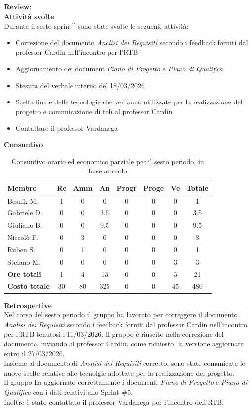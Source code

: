 \documentclass[a4paper,10pt]{article}
\begin{document}
\textbf{Review}: \\
\textbf{Attività svolte}\\
Durante il sesto sprint$^G$ sono state svolte le seguenti attività:
\begin{itemize}
  \item Correzione del documento \textit{Analisi dei Requisiti} secondo i feedback forniti dal professor Cardin nell'incontro per l'RTB
  \item Aggiornamento dei document \textit{Piano di Progetto} e \textit{Piano di Qualifica}
  \item Stesura del verbale interno del 18/03/2026
  \item Scelta finale delle tecnologie che verranno utilizzate per la realizzazione del progetto e comunicazione di tali al professor Cardin
  \item Contattare il professor Vardanega
\end{itemize}
\textbf{Consuntivo}
\begin{table}[H]
\centering
\begin{tabular}{|l|c|c|c|c|c|c|c|}
\hline
\textbf{Membro} & \textbf{Re} & \textbf{Amm} & \textbf{An} & \textbf{Progr} & \textbf{Proge} & \textbf{Ve} & \textbf{Totale} \\
\hline
Besnik M.   & 1   & 0   & 0   & 0   & 0   & 0   & 1   \\
Gabriele D. & 0   & 0   & 3.5 & 0   & 0   & 0   & 3.5 \\
Giuliano B. & 0   & 0   & 9.5 & 0   & 0   & 0   & 9.5 \\
Niccolò F.  & 0   & 3   & 0   & 0   & 0   & 0   & 3   \\
Ruben S.    & 0   & 1   & 0   & 0   & 0   & 0   & 1   \\
Stefano M.  & 0   & 0   & 0   & 0   & 0   & 3   & 3   \\
\hline
\textbf{Ore totali}   & 1   & 4   & 13   & 0     & 0    & 3    & 21  \\
\hline
\textbf{Costo totale} & 30  & 80  & 325  & 0     & 0    & 45   & 480 \\
\hline
\end{tabular}
\caption{Consuntivo orario ed economico parziale per il sesto periodo, in base al ruolo}
\end{table}

\textbf{Retrospective} \\
Nel corso del sesto periodo il gruppo ha lavorato per correggere il documento \textit{Analisi dei Requisiti} secondo i feedback forniti dal professor Cardin nell'incontro per l'RTB tenutosi l'11/03/2026. Il gruppo è riuscito nella correzione del documento, inviando al professor Cardin, come richiesto, la versione aggiornata entro il 27/03/2026. \\
Insieme al documento di \textit{Analisi dei Requisiti} corretto, sono state comunicate le nuove scelte relative alle tecnolgie adottate per la realizzazione del progetto. \\
Il gruppo ha aggiornato correttamente i documenti \textit{Piano di Progetto} e \textit{Piano di Qualifica} con i dati relativi allo Sprint \#5. \\
Inoltre è stato contattato il professor Vardanega per l'incontro dell'RTB.
\end{document}
